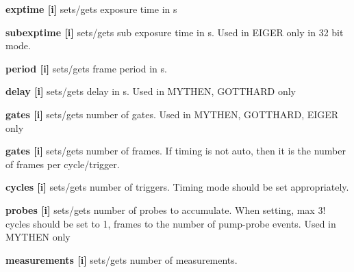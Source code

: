 \begin{DoxyItemize}
\item {\bfseries exptime \mbox{[}i\mbox{]}} sets/gets exposure time in s
\end{DoxyItemize}


\begin{DoxyItemize}
\item {\bfseries subexptime \mbox{[}i\mbox{]}} sets/gets sub exposure time in s. Used in EIGER only in 32 bit mode.
\end{DoxyItemize}


\begin{DoxyItemize}
\item {\bfseries period \mbox{[}i\mbox{]}} sets/gets frame period in s.
\end{DoxyItemize}


\begin{DoxyItemize}
\item {\bfseries delay \mbox{[}i\mbox{]}} sets/gets delay in s. Used in MYTHEN, GOTTHARD only
\end{DoxyItemize}


\begin{DoxyItemize}
\item {\bfseries gates \mbox{[}i\mbox{]}} sets/gets number of gates. Used in MYTHEN, GOTTHARD, EIGER only
\end{DoxyItemize}


\begin{DoxyItemize}
\item {\bfseries gates \mbox{[}i\mbox{]}} sets/gets number of frames. If {\ttfamily timing} is not {\ttfamily auto}, then it is the number of frames per cycle/trigger.
\end{DoxyItemize}


\begin{DoxyItemize}
\item {\bfseries cycles \mbox{[}i\mbox{]}} sets/gets number of triggers. Timing mode should be set appropriately.
\end{DoxyItemize}


\begin{DoxyItemize}
\item {\bfseries probes \mbox{[}i\mbox{]}} sets/gets number of probes to accumulate. When setting, max 3! cycles should be set to 1, frames to the number of pump-\/probe events. Used in MYTHEN only
\end{DoxyItemize}


\begin{DoxyItemize}
\item {\bfseries measurements \mbox{[}i\mbox{]}} sets/gets number of measurements.
\end{DoxyItemize}



